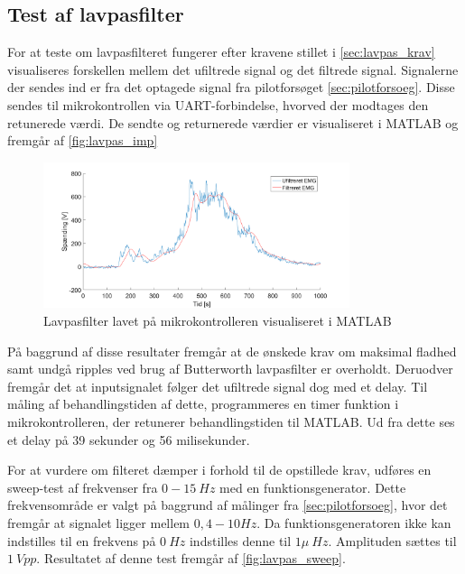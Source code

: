 \subsection{Test af lavpasfilter}
For at teste om lavpasfilteret fungerer efter kravene stillet i \autoref{sec:lavpas_krav} visualiseres forskellen mellem det ufiltrede signal og det filtrede signal. Signalerne der sendes ind er fra det optagede signal fra pilotforsøget \autoref{sec:pilotforsoeg}. Disse sendes til mikrokontrollen via UART-forbindelse, hvorved der modtages den retunerede værdi. De sendte og returnerede værdier er visualiseret i MATLAB og fremgår af \autoref{fig:lavpas_imp}

\begin{figure}[H]
\centering
\includegraphics[width=0.8\textwidth]{figures/EMG_test}
\caption{Lavpasfilter lavet på mikrokontrolleren visualiseret i MATLAB}
\label{fig:lavpas_imp}
\end{figure}

På baggrund af disse resultater fremgår at de ønskede krav om maksimal fladhed samt undgå ripples ved brug af Butterworth lavpasfilter er overholdt. 
Deruodver fremgår det at inputsignalet følger det ufiltrede signal dog med et delay. Til måling af behandlingstiden af dette, programmeres en timer funktion i mikrokontrolleren, der retunerer behandlingstiden til MATLAB. Ud fra dette ses et delay på 39 sekunder og 56 milisekunder.


For at vurdere om filteret dæmper i forhold til de opstillede krav, udføres en sweep-test af frekvenser fra $0-15~Hz$ med en funktionsgenerator. Dette frekvensområde er valgt på baggrund af målinger fra \autoref{sec:pilotforsoeg}, hvor det fremgår at signalet ligger mellem $0,4-10Hz$.  Da funktionsgeneratoren ikke kan indstilles til en frekvens på $0~Hz$ indstilles denne til $1 \mu~Hz$. Amplituden sættes til $1~Vpp$. Resultatet af denne test fremgår af \autoref{fig:lavpas_sweep}. 


